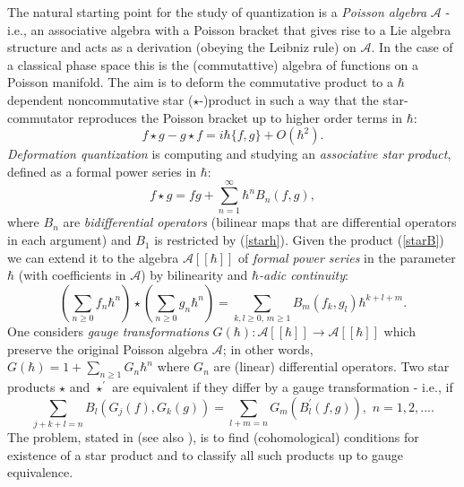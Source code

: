 \documentclass[12pt]{article}
\begin{document}
The natural starting point for the study of quantization is a {\it Poisson algebra} ${\mathcal A}$ - i.e., an associative 
algebra with a Poisson bracket that gives rise to a Lie algebra structure and acts as a derivation (obeying the Leibniz rule) 
on ${\mathcal A}$. In the case of a classical phase space this is the (commutattive) algebra of functions on a Poisson manifold.
The aim is to deform the commutative product to a $\hbar$ dependent noncommutative star ($\star$-)product in 
such a way that the star-commutator reproduces the Poisson bracket up to higher order terms in $\hbar$:
\begin{equation}
\label{starh}
f\star g - g\star f = i\hbar\{f, g\} + O(\hbar^2).
\end{equation}
{\it Deformation quantization} is computing and studying an {\it associative star product}, 
defined as a formal power series in $\hbar$: 
\begin{equation}
\label{starB}
f\star g = fg + \sum_{n=1}^\infty \hbar^n B_n(f, g),
\end{equation}
where $B_n$ are {\it bidifferential operators} (bilinear maps that are differential operators in each argument) and $B_1$ is
restricted by (\ref{starh}). Given the product (\ref{starB}) we can extend it to the algebra ${\mathcal A}[[\hbar]]$ of {\it 
formal power series} in the parameter $\hbar$ (with coefficients in ${\mathcal A}$) by bilinearity and {\it $\hbar$-adic continuity}:
\begin{equation}
(\sum_{n\geq 0}f_n\hbar^n)\star (\sum_{n\geq 0}g_n\hbar^n) = \sum_{k,l\geq 0, \, m\geq 1} B_m(f_k, g_l)\hbar^{k+l+m}.
\end{equation}
One considers \cite{W94} {\it gauge transformations} $G(\hbar): {\mathcal A}[[\hbar]] \rightarrow {\mathcal A}[[\hbar]]$ which preserve
the original Poisson algebra ${\mathcal A}$; in other words, $G(\hbar) = 1 + \sum_{n\geq 1} G_n \hbar^n$ where $G_n$ are (linear) 
differential operators. Two star products $\star$ and $\star^{'}$ are equivalent if they differ by a gauge transformation - i.e., if 
\begin{equation}
\label{equiv}
\sum_{j+k+l=n}B_l(G_j(f), G_k(g)) = \sum_{l+m=n} G_m(B^{'}_l(f, g)), \, \, n = 1, 2, ... . 
\end{equation}
The problem, stated in \cite{BFLS} (see also \cite{W94}), is to find (cohomological) conditions for existence of a star product and to classify all such products up to gauge equivalence.
\end{document}
